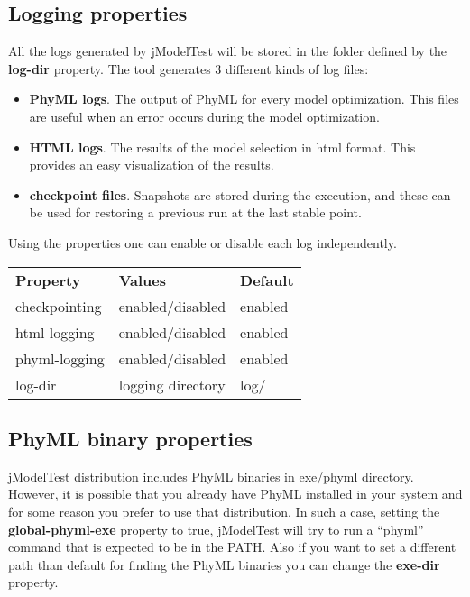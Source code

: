 \subsection{Logging properties}

All the logs generated by jModelTest will be stored in the folder defined by the {\bf log-dir} property. The tool generates 3 different kinds of log files:
\begin{itemize}
\item {\bf PhyML logs}. The output of PhyML for every model optimization. This files are useful when an error occurs during the model optimization.
\item {\bf HTML logs}. The results of the model selection in html format. This provides an easy visualization of the results.
\item {\bf checkpoint files}. Snapshots are stored during the execution, and these can be used for restoring a previous run at the last stable point.
\end{itemize}

Using the properties one can enable or disable each log independently.

\begin{center}
\begin{tabular}{|l|l|l|}
\hline
{\bf Property} & {\bf Values} & {\bf Default} \\
checkpointing  & enabled/disabled & enabled \\
html-logging   & enabled/disabled & enabled \\
phyml-logging  & enabled/disabled & enabled \\
log-dir        & logging directory & log/ \\
\hline
\end{tabular}
\end{center}

\subsection{PhyML binary properties}

jModelTest distribution includes PhyML binaries in exe/phyml directory. However, it is possible that you already have PhyML installed in your system and for some reason you prefer to use that distribution. In such a case, setting the {\bf global-phyml-exe} property to true, jModelTest will try to run a ``phyml'' command that is expected to be in the PATH. Also if you want to set a different path than default for finding the PhyML binaries you can change the {\bf exe-dir} property.

